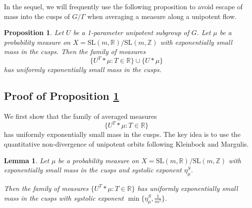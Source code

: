 \documentclass[10pt,reqno]{amsart}
\theoremstyle{Theorem}
\newtheorem{proposition}[theorem]{Proposition}
\newtheorem{lemma}[theorem]{Lemma}
\theoremstyle{definition}
\theoremstyle{remark}
\newcommand{\R}{\mathbb {R}}
\newcommand{\Z}{\mathbb {Z}}
\newcommand{\Sl}{\mathrm{SL}}
\begin{document}

In the sequel, we will frequently use the following proposition to avoid  escape of mass into the cusps of $G/\Gamma$ when  averaging a measure along a unipotent flow.
\begin{proposition}\label{prop:bananas}Let $U$ be a 1-parameter unipotent subgroup of $G$.
Let $\mu$ be a probability measure on $X = \Sl(m,\R)/\Sl(m,\Z)$ with  exponentially small mass  in the cusps.  Then the family of  measures $$\{U^T\ast \mu: T\in \R\} \cup \{U\ast \mu\}$$
has uniformly exponentially small mass in the cusps.   %
\end{proposition}

\subsection{Proof of Proposition \ref{prop:bananas}}

We first show that the family of averaged measures  $$\{U^T\ast \mu: T\in \R\}$$ has uniformly exponentially small mass in the cusps.  The key idea is to use the quantitative non-divergence of unipotent orbits following Kleinbock and Margulis.
\begin{lemma}
\label{lemma:translates}
Let $\mu$ be a probability measure on $X = \Sl(m,\R)/\Sl(m,\Z)$ with    exponentially small mass in the cusps   and systolic exponent $\eta^S_\mu$.

Then the  family of measures  $\{U^T\ast \mu: T\in \R\}$ has uniformly exponentially small mass in the cusps with   systolic exponent   $\min\{\eta^S_\mu,  \frac 1{m^2}\}$.
\end{lemma}
\end{document}
